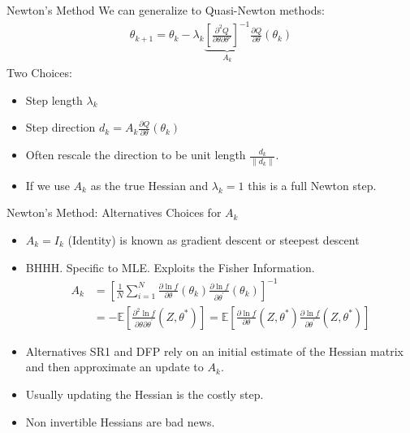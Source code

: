 \documentclass[aspectratio=169]{beamer}
\newcommand{\norm}[1]{\left\lVert#1\right\rVert}
\begin{document}
\begin{frame}{Newton's Method}
We can generalize to Quasi-Newton methods:
\begin{align*}
\theta_{k+1} = \theta_k -  \lambda_k \underbrace{\left[ \frac{\partial^2 Q}{\partial \theta \partial \theta'} \right]^{-1}}_{A_k} \frac{\partial Q}{\partial \theta}(\theta_k)
\end{align*}
Two Choices:
\begin{itemize}
\item Step length $\lambda_k$
\item Step direction $d_k=A_k \frac{\partial Q}{\partial \theta}(\theta_k)$
\item Often rescale the direction to be unit length $\frac{d_k}{\norm{d_k}}$.
\item If we use $A_k$ as the true Hessian and $\lambda_k=1$ this is a \alert{full Newton step}.
\end{itemize}
\end{frame}

\begin{frame}{Newton's Method: Alternatives}
Choices for $A_k$
\begin{itemize}
\item $A_k= I_{k}$ (Identity) is known as \alert{gradient descent} or \alert{steepest descent}
\item BHHH. Specific to MLE. Exploits the \alert{Fisher Information}.
\begin{align*}
A _ { k } 
&= \left[ \frac { 1 } { N } \sum _ { i = 1 } ^ { N } \frac { \partial \ln f } { \partial \theta } \left( \theta _ { k } \right) \frac { \partial \ln f } { \partial \theta ^ { \prime } } \left( \theta _ { k } \right) \right] ^ { - 1 }\\
&=- \mathbb { E } \left[ \frac { \partial ^ { 2 } \ln f } { \partial \theta \partial \theta ^ { \prime } } \left( Z , \theta ^ { * } \right) \right] 
= \mathbb { E } \left[ \frac { \partial \ln f } { \partial \theta } \left( Z , \theta ^ { * } \right) \frac { \partial \ln f } { \partial \theta ^ { \prime } } \left( Z , \theta ^ { * } \right) \right]
\end{align*}
\item Alternatives \alert{SR1} and \alert{DFP} rely on an initial estimate of the Hessian matrix and then approximate an update to $A_k$.
\item Usually updating the Hessian is the costly step.
\item Non invertible Hessians are bad news.
\end{itemize}
\end{frame}
\end{document}
